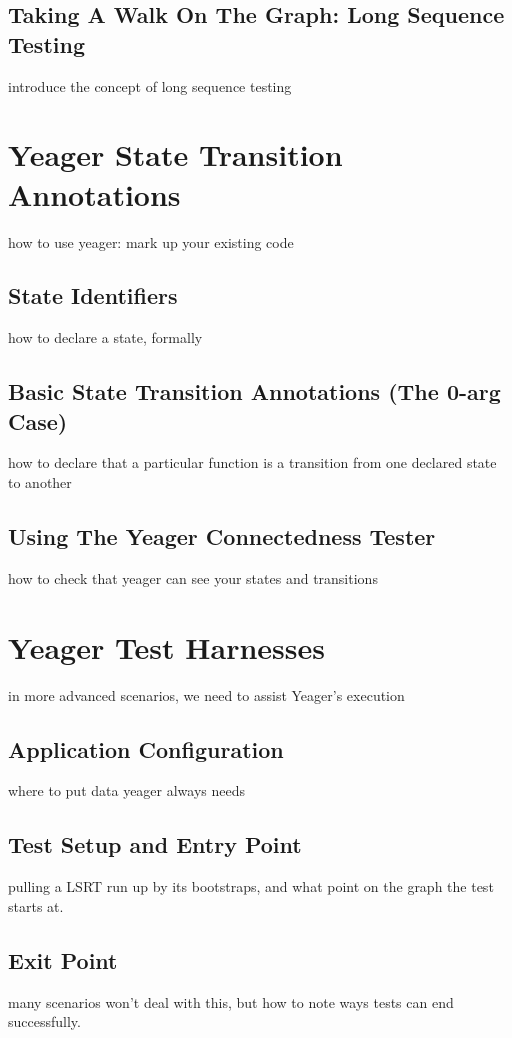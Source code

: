 \subsection{Taking A Walk On The Graph: Long Sequence Testing}
introduce the concept of long sequence testing

\section{Yeager State Transition Annotations}
how to use yeager: mark up your existing code

\subsection{State Identifiers}
how to declare a state, formally

\subsection{Basic State Transition Annotations (The 0-arg Case)}
how to declare that a particular function is a transition from one declared state to another

\subsection{Using The Yeager Connectedness Tester}
how to check that yeager can see your states and transitions

\section{Yeager Test Harnesses}
in more advanced scenarios, we need to assist Yeager's execution

\subsection{Application Configuration}
where to put data yeager always needs

\subsection{Test Setup and Entry Point}
pulling a LSRT run up by its bootstraps, and what point on the graph the test starts at.

\subsection{Exit Point}
many scenarios won't deal with this, but how to note ways tests can end successfully.

